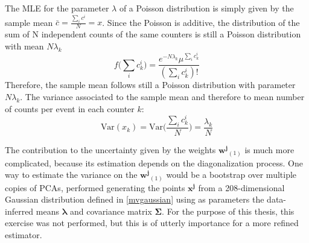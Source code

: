 The MLE for the parameter $\lambda$ of a Poisson distribution is simply given by the sample mean $\bar{c}=\frac{\sum_i c^i}{N}=x$. 
 Since the Poisson is additive, the distribution of the sum of N independent counts of the same counters is still a Poisson distribution with mean $N\lambda_k$
 \begin{equation}
     f\bigl(\sum_i c^i_k\bigr) = \frac{e^{-N\lambda_k} \mu^{\sum_i c^i_k}}{(\sum_i c^i_k)!}
 \end{equation}
Therefore, the sample mean follows still a Poisson distribution with parameter $N\lambda_k$. The variance associated to the sample mean and therefore to mean number of counts per event in each counter $k$:
\begin{equation}
    \text{Var}(x_k) =\text{Var}\biggl(\frac{\sum_i c^i_k}{N}\biggr) = \frac{\lambda_k}{N}
\end{equation}

The contribution to the uncertainty given by the weights $\mathbf{w^j}_{(1)}$ is much more complicated, because its estimation depends on the diagonalization process. One way to estimate the variance on the $\mathbf{w^j}_{(1)}$ would be a  bootstrap over multiple copies of PCAs, performed generating the points $\mathbf{x^{j}}$ from a 208-dimensional Gaussian distribution defined in \eqref{mvgaussian} using as parameters the data-inferred means $\mathbf{\lambda}$ and covariance matrix $\mathbf{\Sigma}$.  For the purpose of this thesis, this exercise was not performed, but this is of utterly importance for a more refined estimator.

